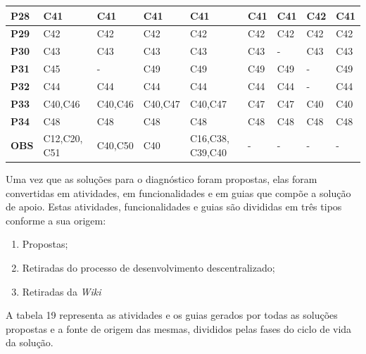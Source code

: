 \begin{longtable}{|M{1.0cm}|M{1.5cm}|M{1.5cm}|M{1.5cm}|M{1.5cm}|M{1.5cm}|M{1.5cm}|M{1.5cm}|M{1.5cm}|}
\textbf{P28} & C41            & C41            & C41            & C41             & C41            & C41            & C42            & C41            \\ \hline
\textbf{P29} & C42            & C42            & C42            & C42             & C42            & C42            & C42            & C42            \\ \hline
\textbf{P30} & C43            & C43            & C43            & C43             & C43            & -              & C43            & C43            \\ \hline
\textbf{P31} & C45            & -              & C49            & C49             & C49            & C49            & -              & C49            \\ \hline
\textbf{P32} & C44            & C44            & C44            & C44             & C44            & C44            & -              & C44            \\ \hline
\textbf{P33} & C40,C46        & C40,C46        & C40,C47        & C40,C47         & C47            & C47            & C40            & C40            \\ \hline
\textbf{P34} & C48            & C48            & C48            & C48             & C48            & C48            & C48            & C48            \\ \hline
\textbf{OBS} & C12,C20, C51    & C40,C50        & C40            & C16,C38, C39,C40 & -              & -              & -              & -              \\ \hline
\end{longtable}
\clearpage

Uma vez que as soluções para o diagnóstico foram propostas, elas foram convertidas em atividades, em funcionalidades e em guias que compõe a solução de apoio. Estas atividades, funcionalidades e guias são divididas em três tipos conforme a sua origem:
\begin{enumerate}
\item Propostas;
\item Retiradas do processo de desenvolvimento descentralizado;
\item Retiradas da \textit{Wiki}
\end{enumerate}

A tabela 19 representa as atividades e os guias gerados por todas as soluções propostas e a fonte de origem das mesmas, divididos pelas fases do ciclo de vida da solução.\newline

